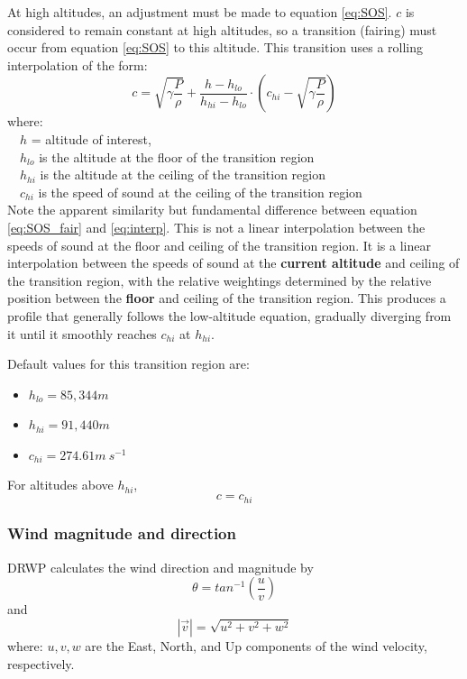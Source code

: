 \documentclass[11pt,fleqn]{report}
\begin{document}
At high altitudes, an adjustment must be made to equation \ref{eq:SOS}.
$c$ is considered to remain constant at high altitudes, so a transition
(fairing) must occur from equation \ref{eq:SOS} to this altitude.
This transition uses a rolling interpolation of the form:
\begin{equation}\label{eq:SOS_fair}
  c = \sqrt{\gamma\frac{P}{\rho}} + \frac {h - h_{lo}}{h_{hi} - h_{lo}} \cdot
  \left( c_{hi} -  \sqrt{\gamma\frac{P}{\rho}} \right)
\end{equation}
where:\\
~~$h$ = altitude of interest,\\
~~$h_{lo}$ is the altitude at the floor of the transition region\\
~~$h_{hi}$ is the altitude at the ceiling of the transition region\\
~~$c_{hi}$ is the speed of sound at the ceiling of the transition region\\

Note the apparent similarity but fundamental difference between equation
\ref{eq:SOS_fair} and \ref{eq:interp}. This is not a linear interpolation
between the speeds of sound at the floor and ceiling of the transition
region. It is a linear interpolation between the speeds of sound at the
\textbf{current altitude} and ceiling of the transition region,
with the relative weightings determined by the relative position between
the \textbf{floor} and ceiling of the transition region. This produces a
profile that generally follows the low-altitude equation, gradually diverging
from it until it smoothly reaches $c_{hi}$ at $h_{hi}$.

Default values for this transition region are:
\begin{itemize}
\item $h_{lo} = 85,344 m$
\item $h_{hi} = 91,440 m$
\item $c_{hi} = 274.61 m\ s^{-1}$
\end{itemize}

For altitudes above $h_{hi}$,
\begin{equation}
  c = c_{hi}
\end{equation}

\clearpage
\subsubsection{Wind magnitude and direction}\label{sec:wind_dir_mag}
DRWP calculates the wind direction and magnitude by
\begin{equation}
\theta = tan^{-1}\left(\frac{u}{v}\right)
\end{equation} and
\begin{equation}
| \vec v| = \sqrt{u^2 + v^2 + w^2}
\end{equation}
where:
$u, v, w$ are the East, North, and Up components of the
wind velocity, respectively.
\end{document}
